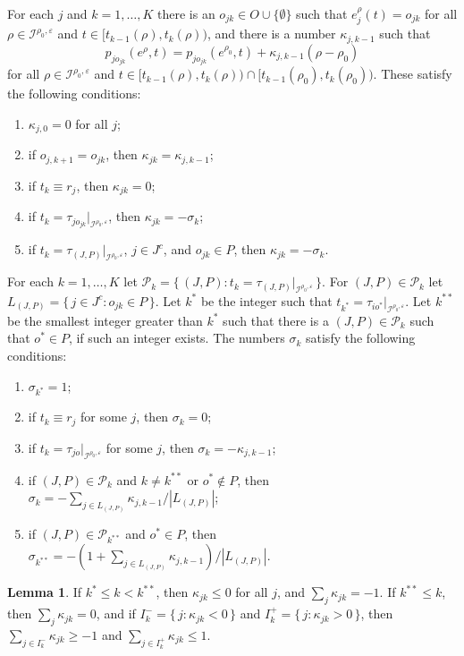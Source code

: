 \documentclass[12pt, A4paper]{article}
\theoremstyle{definition}
\newtheorem{lem}{Lemma}
\newcommand{\cI}{\mathcal{I}}
\newcommand{\cP}{\mathcal{P}}
\newcommand{\varep}{\varepsilon}
\begin{document}
\begin{appendix}
For each $j$ and $k = 1, \ldots, K$ there is an $o_{jk} \in O \cup \{\emptyset\}$ such that $e_j^\rho(t) = o_{jk}$ for all $\rho \in \cI^{\rho_0,\varep}$ and $t \in [t_{k-1}(\rho),t_k(\rho))$, and there is a number $\kappa_{j,k-1}$ such that
$$p_{jo_{jk}}(e^\rho,t) = p_{jo_{jk}}(e^{\rho_0},t) + \kappa_{j,k-1} (\rho - \rho_0)$$
for all $\rho \in \cI^{\rho_0,\varep}$ and $t \in [t_{k-1}(\rho),t_k(\rho)) \cap [t_{k-1}(\rho_0),t_k(\rho_0))$.  These satisfy the following conditions:
\begin{enumerate}
  \item[(a)] $\kappa_{j,0} = 0$ for all $j$;
  \item[(b)] if $o_{j,k+1} = o_{jk}$, then $\kappa_{jk} = \kappa_{j,k-1}$;
  \item[(c)] if $t_k \equiv r_j$, then $\kappa_{jk} = 0$;
  \item[(d)] if $t_k = \tau_{{jo_{jk}}}|_{\cI^{\rho_0,\varep}}$, then $\kappa_{jk} = -\sigma_k$;
  \item[(e)] if $t_k = \tau_{(J,P)}|_{\cI^{\rho_0,\varep}}$, $j \in J^c$, and $o_{jk} \in P$, then $\kappa_{jk} = -\sigma_k$.
\end{enumerate}

For each $k = 1, \ldots, K$ let $\cP_k = \{\, (J,P) : t_k = \tau_{(J,P)}|_{\cI^{\rho_0,\varep}} \,\}$.  For $(J,P) \in \cP_k$ let $L_{(J,P)} = \{\, j \in J^c : o_{jk} \in P \,\}$.  Let $k^*$ be the integer such that $t_{k^*} = \tau_{{io^*}}|_{\cI^{\rho_0,\varep}}$.  Let $k^{**}$ be the smallest integer greater than $k^*$ such that there is a $(J,P) \in \cP_k$ such that $o^* \in P$, if such an integer exists.  The numbers $\sigma_k$ satisfy the following conditions:
\begin{enumerate}
  \item[(a)] $\sigma_{k^*} = 1$;
  \item[(b)] if $t_k \equiv r_j$ for some $j$, then $\sigma_k = 0$;
  \item[(c)] if $t_k = \tau_{{jo}}|_{\cI^{\rho_0,\varep}}$ for some $j$, then $\sigma_k = -\kappa_{j,k-1}$;
  \item[(d)] if $(J,P) \in \cP_k$ and $k \ne k^{**}$ or $o^* \notin P$, then $\sigma_k = -\sum_{j \in L_{(J,P)}} \kappa_{j,k-1}/|L_{{(J,P)}}|$;
  \item[(e)] if $(J,P) \in \cP_{k^{**}}$ and $o^* \in P$, then $\sigma_{k^{**}} = -(1 + \sum_{j \in L_{(J,P)}} \kappa_{j,k-1})/|L_{{(J,P)}}|$.
\end{enumerate}

\begin{lem} \label{lemma:IndirectEffect}
  If $k^* \le k < k^{**}$, then $\kappa_{jk} \le 0$ for all $j$, and $\sum_j \kappa_{jk} = -1$.  If $k^{**} \le k$, then $\sum_j \kappa_{jk} = 0$, and if $I^-_k = \{\, j : \kappa_{jk} < 0 \,\}$ and $I^+_k = \{\, j : \kappa_{jk} > 0 \,\}$, then $\sum_{j \in I^-_k} \kappa_{jk} \ge -1$ and $\sum_{j \in I^+_k} \kappa_{jk} \le 1$.
\end{lem}


\end{appendix}
\end{document}

